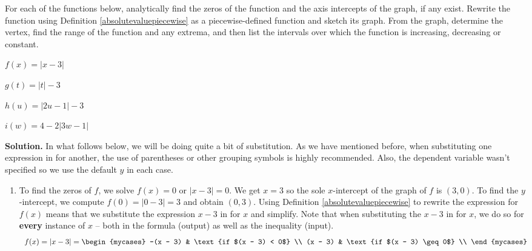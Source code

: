 \documentclass{ximera}
\begin{document}
\begin{ex}   \label{absvaluegraph1} For each of the functions below, analytically find the zeros of the function and the axis intercepts of the graph, if any exist.  Rewrite the function using Definition \ref{absolutevaluepiecewise} as a piecewise-defined function and sketch its graph.  From the graph, determine the vertex, find the range of the function and any extrema, and then list the intervals over which the function is increasing, decreasing or constant.

\begin{enumerate}
\begin{multicols}{4}

\item  $f(x) = |x - 3|$
\item  $g(t) = |t| - 3$
\item  $h(u) = |2u - 1| - 3$
\item  $i(w) = 4 - 2|3w - 1|$ 

\end{multicols}
\end{enumerate}

{\bf Solution.}  In what follows below, we will be doing quite a bit of substitution.  As we have mentioned before, when substituting one expression in for another, the use of parentheses or other grouping symbols is highly recommended.  Also, the dependent variable wasn't specified so we use the default $y$ in each case.

\begin{enumerate}

\item  To find the zeros of $f$, we solve $f(x) = 0$ or $|x - 3| = 0$.  We get $x = 3$ so  the sole $x$-intercept of the graph of $f$ is $(3, 0)$.  To find the $y$-intercept, we compute $f(0) = |0 - 3| = 3$ and obtain $(0,3)$.     Using Definition \ref{absolutevaluepiecewise} to rewrite the expression for $f(x)$ means that we substitute the expression $x - 3$ in for $x$ and simplify.  Note that when substituting the $x - 3$ in for $x$,  we do so for \textbf{every} instance of $x$  -- both in the formula (output) as well as the inequality (input). \[ \begin{array}{ccc}

f(x) = |x - 3| = \begin{mycases} 
      -(x - 3) &  \text{if $(x - 3) < 0$} \\
      (x - 3)  & \text{if $(x - 3) \geq 0$} \\
   \end{mycases} &
   

\end{array}\]
\end{enumerate}
\end{ex}
\end{document}
